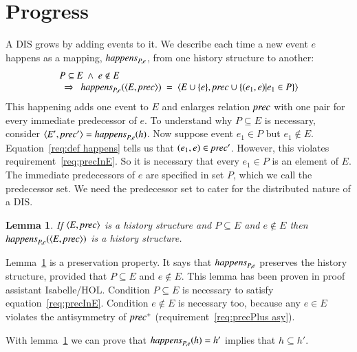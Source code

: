 \documentclass{elsarticle}
\newtheorem{lemma}{Lemma}
\def\id#1{\text{\it #1\/}}
\def\Events{{\mathit E}}
\begin{document}
\section{Progress}
\label{sct:Progress}

	A DIS grows by adding events to it.
	We describe each time a new event $e$ happens as a mapping, $\id{happens}_{P,e}$, from one history structure to another:
\begin{equation}
\begin{array}[b]{l}
	P\subseteq\Events\ \wedge\ e\notin E\\
	\ \ \Rightarrow\ \ \id{happens}_{P,e}(\la \Events, \id{prec}\ra)\ =\ \la \Events\cup\{e\}, \id{prec}\cup\{(e_1,e) | e_1\in P\}\ra
\end{array}
\label{req:def happens}
\end{equation}
	This happening adds one event to $\Events$ and enlarges relation $\id{prec}$ with one pair for every immediate predecessor of $e$.
	To understand why $P\subseteq\Events$ is necessary,
	consider $\la \Events', \id{prec}'\ra=\id{happens}_{P,e}(h)$.
	Now suppose event $e_1\in P$ but $e_1\notin\Events$.
	Equation~\ref{req:def happens} tells us that $(e_1,e)\in\id{prec}'$.
	However, this violates requirement~\ref{req:precInE}.
	So it is necessary that every $e_1\in P$ is an element of $\Events$.
	The immediate predecessors of $e$ are specified in set $P$, which we call the predecessor set.
	We need the predecessor set to cater for the distributed nature of a DIS.
\begin{lemma}
\label{lemma:happens preserves history structure}
	If $\la \Events, \id{prec}\ra$ is a history structure and $P\subseteq\Events$ and $e\notin\Events$
	then $\id{happens}_{P,e}(\la \Events, \id{prec}\ra)$ is a history structure.
\end{lemma}
	Lemma~\ref{lemma:happens preserves history structure} is a preservation property.
	It says that $\id{happens}_{P,e}$ preserves the history structure,
	provided that $P\subseteq\Events$ and $e\notin\Events$.
	This lemma has been proven in proof assistant Isabelle/HOL.
	Condition $P\subseteq\Events$ is necessary to satisfy equation~\ref{req:precInE}.
	Condition $e\notin\Events$ is necessary too,
	because any $e\in\Events$ violates the antisymmetry of $\id{prec}^+$ (requirement~\ref{req:precPlus asy}).

	With lemma~\ref{lemma:happens preserves history structure} we can prove that $\id{happens}_{P,e}(h)=h'$ implies that $h\subseteq h'$.
\end{document}
